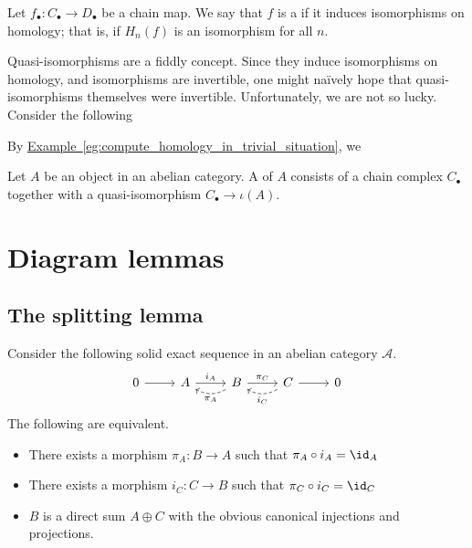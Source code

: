 \documentclass[main.tex]{subfiles}
\begin{document}
\begin{definition}
  \label{def:quasi_isomorphism}
  Let $f_{\bullet}\colon C_{\bullet} \to D_{\bullet}$ be a chain map. We say that $f$ is a  if it induces isomorphisms on homology; that is, if $H_{n}(f)$ is an isomorphism for all $n$.
\end{definition}

Quasi-isomorphisms are a fiddly concept. Since they induce isomorphisms on homology, and isomorphisms are invertible, one might naïvely hope that quasi-isomorphisms themselves were invertible. Unfortunately, we are not so lucky. Consider the following

By \hyperref[eg:compute_homology_in_trivial_situation]{Example~\ref*{eg:compute_homology_in_trivial_situation}}, we

\begin{definition}[resolution]
  \label{def:resolution}
  Let $A$ be an object in an abelian category. A  of $A$ consists of a chain complex $C_{\bullet}$ together with a quasi-isomorphism $C_{\bullet} \to \iota(A)$.
\end{definition}

\section{Diagram lemmas}
\label{sec:diagram_lemmas}

\subsection{The splitting lemma}
\label{ssc:the_splitting_lemma}

\begin{lemma}
  \label{lemma:splitting_lemma}
  Consider the following solid exact sequence in an abelian category $\mathcal{A}$.
  \begin{equation*}
    \begin{tikzcd}
      0
      \arrow[r]
      & A
      \arrow[r, "i_{A}"]
      & B
      \arrow[r, "\pi_{C}"]
      \arrow[l, bend left, dashed, "\pi_{A}"]
      & C
      \arrow[r]
      \arrow[l, bend left, dashed, "i_{C}"]
      & 0
    \end{tikzcd}
  \end{equation*}
  The following are equivalent.
  \begin{itemize}
    \item There exists a morphism $\pi_{A}\colon B \to A$ such that $\pi_{A} \circ i_{A} = \id_{A}$

    \item There exists a morphism $i_{C}\colon C \to B$ such that $\pi_{C} \circ i_{C} = \id_{C}$

    \item $B$ is a direct sum $A \oplus C$ with the obvious canonical injections and projections.
  \end{itemize}
\end{lemma}
\end{document}

